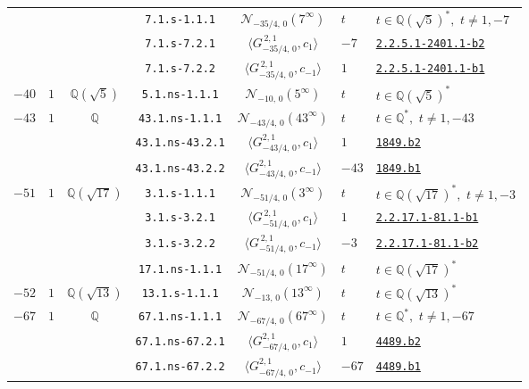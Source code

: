 \documentclass[11pt]{amsart}
\newcommand{\eclabel}[1]{\href{https://www.lmfdb.org/EllipticCurve/Q/#1}{\texttt{#1}}}
\newcommand{\ecnflabel}[2]{\href{https://www.lmfdb.org/EllipticCurve/#1-#2}{\texttt{#1-#2}}}
\theoremstyle{definition}
\newcommand{\Q}{\mathbb Q}
\newcommand{\QQ}{\mathbb Q}
\begin{document}
{\begin{longtable}{|c|c|c|c|c|l|l|}
 & &&  \texttt{7.1.s-1.1.1} & $\mathcal{N}_{-35/4,\,0}(7^{\infty})$ &   $t$ &  $t\in \Q(\sqrt{5})^*,\,\,t\ne 1,-7 $ \\ \cline{4-7} 
 & &&  \texttt{7.1.s-7.2.1} & $\langle G^{\,2,1}_{-35/4,\,0},c_{1}\rangle$  &   $-7$ &  \ecnflabel{2.2.5.1}{2401.1-b2} \\ \cline{4-7} 
 & &&  \texttt{7.1.s-7.2.2} & $\langle G^{\, 2,1}_{-35/4,\,0},c_{-1}\rangle$ &   $1$ & \ecnflabel{2.2.5.1}{2401.1-b1}  \\ \hline
$-40$ & $1$ &  $\Q(\sqrt{5})$ & \texttt{5.1.ns-1.1.1} & $\mathcal{N}_{-10,\,0}(5^{\infty})$ &   $t$ &  $t\in \Q(\sqrt{5})^*$ \\ \hline
{$-43$} & {$1$}  & {$\QQ$}  
& \texttt{43.1.ns-1.1.1} & $\mathcal{N}_{-43/4,\,0}(43^{\infty})$ &   $t$ &  $t\in \Q^*,\,\,t\ne 1,-43 $ \\ \cline{4-7} 
 & &  & \texttt{43.1.ns-43.2.1} & $\langle G^{2,1}_{-43/4,\,0},c_{1}\rangle$ &   $1$ &  \eclabel{1849.b2} \\ \cline{4-7} 
 & &  & \texttt{43.1.ns-43.2.2} & $\langle G^{2,1}_{-43/4,\,0},c_{-1}\rangle$ &   $-43$ & \eclabel{1849.b1} \\ \hline
{$-51$} & {$1$} &  {$\Q(\sqrt{17})$} 
 & \texttt{3.1.s-1.1.1} & $\mathcal{N}_{-51/4,\,0}(3^{\infty})$ &   $t$ &  $t\in \Q(\sqrt{17})^*,\,\,t\ne 1,-3 $ \\ \cline{4-7} 
& &  & \texttt{3.1.s-3.2.1} & $\langle G^{\,2,1}_{-51/4,\,0},c_{1}\rangle$ &   $1$ &   \ecnflabel{2.2.17.1}{81.1-b1}\\ \cline{4-7} 
& &  & \texttt{3.1.s-3.2.2} & $\langle G^{\, 2,1}_{-51/4,\,0},c_{-1}\rangle$ &   $-3$ &   \ecnflabel{2.2.17.1}{81.1-b2} \\ \cline{4-7} 
& &  & \texttt{17.1.ns-1.1.1} & $\mathcal{N}_{-51/4,\,0}(17^{\infty})$ &   $t$ &  $t\in \Q(\sqrt{17})^*$ \\ \hline
$-52$ & $1$ & $\Q(\sqrt{13})$ & \texttt{13.1.s-1.1.1} & $\mathcal{N}_{-13,\,0}(13^{\infty})$ &   $t$ &  $t\in \Q(\sqrt{13})^*$ \\ \hline
{$-67$}  & {$1$}  & {$\QQ$}   
& \texttt{67.1.ns-1.1.1} & $\mathcal{N}_{-67/4,\,0}(67^{\infty})$ &   $t$ &  $t\in \Q^*,\,\,t\ne 1,-67 $ \\ \cline{4-7} 
 & &  & \texttt{67.1.ns-67.2.1} & $\langle G^{2,1}_{-67/4,\,0},c_{1}\rangle$ &   $1$ & \eclabel{4489.b2}  \\ \cline{4-7} 
 & &  & \texttt{67.1.ns-67.2.2} & $\langle G^{2,1}_{-67/4,\,0},c_{-1}\rangle$ &   $-67$ & \eclabel{4489.b1} \\ \hline

\end{longtable}}
\end{document}
